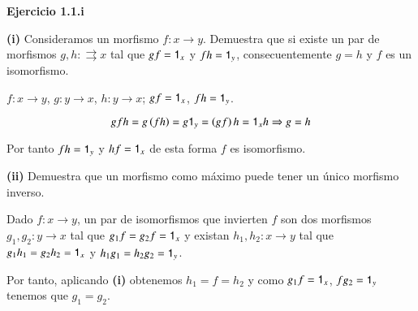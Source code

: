 \begin{exercise}\label{ex:1.1}
  {\bf Ejercicio 1.1.i}

  {\bf (i)} Consideramos un morfismo $f \colon x \rightarrow y$. Demuestra que si existe un par de morfismos $g,h \colon \rightrightarrows x$ tal que $gf=\textup{\textsf{1}}_{x}$ y $fh=\textup{\textsf{1}}_{y}$,
  consecuentemente $g=h$ y $f$ es un isomorfismo.


  $f\colon x \to y$, $g\colon y \to x$, $h\colon y \to x$; $gf=\textup{\textsf{1}}_{x}$, $fh=\textup{\textsf{1}}_{y}$.

  \[
  gfh = g \left(fh\right)=g \textup{\textsf{1}}_{y} = \left(gf\right)h = \textup{\textsf{1}}_{x}h \Rightarrow g=h
  \]

  Por tanto $fh=\textup{\textsf{1}}_{y}$ y $hf=\textup{\textsf{1}}_{x}$ de esta forma $f$ es isomorfismo.

  {\bf (ii)} Demuestra que un morfismo como máximo puede tener un único morfismo inverso.

  Dado $f\colon x \to y$, un par de isomorfismos que invierten $f$ son dos morfismos $g_1,g_2\colon y \to x$ tal que $g_1f=g_2f=\textup{\textsf{1}}_{x}$ y existan 
  $h_1,h_2 \colon x \to y$ tal que $g_1h_1=g_2h_2=\textup{\textsf{1}}_{x}$ y $h_1g_1=h_2g_2=\textup{\textsf{1}}_{y}$.

  Por tanto, aplicando {\bf (i)} obtenemos $h_1=f=h_2$ y como $g_1f=\textup{\textsf{1}}_{x}$, $fg_2=\textup{\textsf{1}}_{y}$ tenemos que $g_1=g_2$.

\end{exercise}
